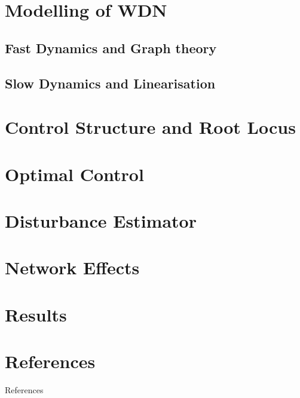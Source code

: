 \documentclass[10pt]{beamer}
\begin{document}

\section{Modelling of WDN}

\subsection{Fast Dynamics and Graph theory}

%
\subsection{Slow Dynamics and Linearisation}

%
\section{Control Structure and Root Locus}


\section{Optimal Control}


\section{Disturbance Estimator}

%
\section{Network Effects}

%
\section{Results}




















\section{References}
\begin{frame}{References}
	
	
\end{frame}

{\aauwavesbg
\begin{frame}
\end{frame}}
\end{document}
